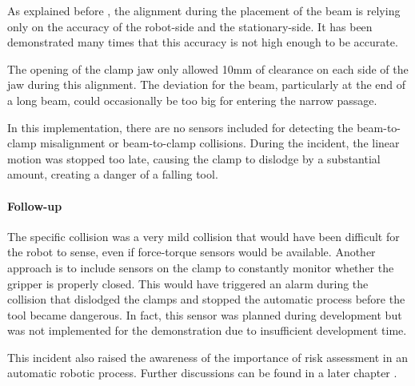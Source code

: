 As explained before , the alignment during the placement of the beam is relying only on the accuracy of the robot-side and the stationary-side. It has been demonstrated many times that this accuracy is not high enough to be accurate. 

The opening of the clamp jaw only allowed 10mm of clearance on each side of the jaw during this alignment. The deviation for the beam, particularly at the end of a long beam, could occasionally be too big for entering the narrow passage.

In this implementation, there are no sensors included for detecting the beam-to-clamp misalignment or beam-to-clamp collisions. During the incident, the linear motion was stopped too late, causing the clamp to dislodge by a substantial amount, creating a danger of a falling tool.

\paragraph{Follow-up}

The specific collision was a very mild collision that would have been difficult for the robot to sense, even if force-torque sensors would be available. Another approach is to include sensors on the clamp to constantly monitor whether the gripper is properly closed. This would have triggered an alarm during the collision that dislodged the clamps and stopped the automatic process before the tool became dangerous. In fact, this sensor was planned during development but was not implemented for the demonstration due to insufficient development time. 

This incident also raised the awareness of the importance of risk assessment in an automatic robotic process. Further discussions can be found in a later chapter .
